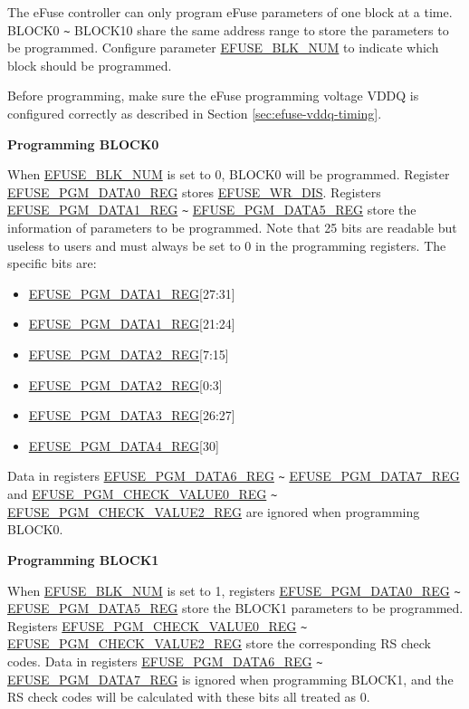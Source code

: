 \documentclass[main\_\_EN.tex]{subfiles}
\begin{document}
The eFuse controller can only program eFuse parameters of one block at a time. BLOCK0 \verb+~+ BLOCK10 share the same address range to store the parameters to be programmed. Configure parameter \hyperref[fielddesc:EFUSEBLKNUM]{EFUSE\_BLK\_NUM} to indicate which block should be programmed.

Before programming, make sure the eFuse programming voltage VDDQ is configured correctly as described in Section \ref{sec:efuse-vddq-timing}.

{\bfseries Programming BLOCK0}
\label{sec:block0_hw_bits}

When \hyperref[fielddesc:EFUSEBLKNUM]{EFUSE\_BLK\_NUM} is set to 0, BLOCK0 will be programmed. Register \hyperref[regdesc:EFUSEPGMDATA0REG]{EFUSE\_PGM\_DATA0\_REG} stores \hyperref[fielddesc:EFUSEWRDIS]{EFUSE\_WR\_DIS}. Registers \hyperref[regdesc:EFUSEPGMDATA1REG]{EFUSE\_PGM\_DATA1\_REG} \verb+~+ \hyperref[regdesc:EFUSEPGMDATA5REG]{EFUSE\_PGM\_DATA5\_REG} store the information of parameters to be programmed. Note that 25 bits are readable but useless to users and must always be set to 0 in the programming registers. The specific bits are:

\begin{itemize}
    \item \hyperref[regdesc:EFUSEPGMDATA1REG]{EFUSE\_PGM\_DATA1\_REG}[27:31]
    \item \hyperref[regdesc:EFUSEPGMDATA1REG]{EFUSE\_PGM\_DATA1\_REG}[21:24]
    \item \hyperref[regdesc:EFUSEPGMDATA2REG]{EFUSE\_PGM\_DATA2\_REG}[7:15]
    \item \hyperref[regdesc:EFUSEPGMDATA2REG]{EFUSE\_PGM\_DATA2\_REG}[0:3]
    \item \hyperref[regdesc:EFUSEPGMDATA3REG]{EFUSE\_PGM\_DATA3\_REG}[26:27]
    \item \hyperref[regdesc:EFUSEPGMDATA4REG]{EFUSE\_PGM\_DATA4\_REG}[30]
\end{itemize}

Data in registers \hyperref[regdesc:EFUSEPGMDATA6REG]{EFUSE\_PGM\_DATA6\_REG} \verb+~+ \hyperref[regdesc:EFUSEPGMDATA7REG]{EFUSE\_PGM\_DATA7\_REG} and \hyperref[regdesc:EFUSEPGMCHECKVALUE0REG]{EFUSE\_PGM\_CHECK\_VALUE0\_REG} \verb+~+ \hyperref[regdesc:EFUSEPGMCHECKVALUE2REG]{EFUSE\_PGM\_CHECK\_VALUE2\_REG} are ignored when programming BLOCK0.

{\bfseries Programming BLOCK1}

When \hyperref[fielddesc:EFUSEBLKNUM]{EFUSE\_BLK\_NUM} is set to 1, registers \hyperref[regdesc:EFUSEPGMDATA0REG]{EFUSE\_PGM\_DATA0\_REG} \verb+~+ \hyperref[regdesc:EFUSEPGMDATA5REG]{EFUSE\_PGM\_DATA5\_REG} store the BLOCK1 parameters to be programmed. Registers \hyperref[regdesc:EFUSEPGMCHECKVALUE0REG]{EFUSE\_PGM\_CHECK\_VALUE0\_REG} \verb+~+ \hyperref[regdesc:EFUSEPGMCHECKVALUE2REG]{EFUSE\_PGM\_CHECK\_VALUE2\_REG} store the corresponding RS check codes. Data in registers \hyperref[regdesc:EFUSEPGMDATA6REG]{EFUSE\_PGM\_DATA6\_REG} \verb+~+ \hyperref[regdesc:EFUSEPGMDATA7REG]{EFUSE\_PGM\_DATA7\_REG} is ignored when programming BLOCK1, and the RS check codes will be calculated with these bits all treated as 0.
\end{document}
